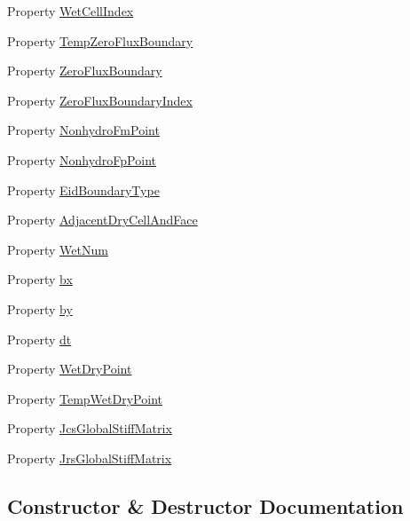 \begin{DoxyCompactItemize}
\item 
Property \hyperlink{class_ndg_nonhydrostatic_solver2d_ae2a95b4131bef735e3c0675026a2f18a}{Wet\+Cell\+Index}
\item 
Property \hyperlink{class_ndg_nonhydrostatic_solver2d_ac0b36311b03d5653b72961f540cbeaf6}{Temp\+Zero\+Flux\+Boundary}
\item 
Property \hyperlink{class_ndg_nonhydrostatic_solver2d_a8c0f32e33234a365fd8ae3e1181e5a3b}{Zero\+Flux\+Boundary}
\item 
Property \hyperlink{class_ndg_nonhydrostatic_solver2d_adeb35a9403549b9a0161daabb0ec450d}{Zero\+Flux\+Boundary\+Index}
\item 
Property \hyperlink{class_ndg_nonhydrostatic_solver2d_ab23f0fef0b83b0a81a23ee77020f0323}{Nonhydro\+Fm\+Point}
\item 
Property \hyperlink{class_ndg_nonhydrostatic_solver2d_a4c60b70b566ca2a7daefe12eba99d14c}{Nonhydro\+Fp\+Point}
\item 
Property \hyperlink{class_ndg_nonhydrostatic_solver2d_af4c2371bad87e70ebb677d36815ca439}{Eid\+Boundary\+Type}
\item 
Property \hyperlink{class_ndg_nonhydrostatic_solver2d_a660ef986dae1ac5e98c306c3963dc0e4}{Adjacent\+Dry\+Cell\+And\+Face}
\item 
Property \hyperlink{class_ndg_nonhydrostatic_solver2d_a11d1fc235608b3deda86743487abca9d}{Wet\+Num}
\item 
Property \hyperlink{class_ndg_nonhydrostatic_solver2d_a541fa409d1701863bb03ffe8addfba86}{bx}
\item 
Property \hyperlink{class_ndg_nonhydrostatic_solver2d_aeacde5b600958bdf34eab79a4171f77b}{by}
\item 
Property \hyperlink{class_ndg_nonhydrostatic_solver2d_a5fa3fa2714d9ebf42a033b01bb7cb3cb}{dt}
\item 
Property \hyperlink{class_ndg_nonhydrostatic_solver2d_aa6ad26c1e1b3d892f40c9301397bc736}{Wet\+Dry\+Point}
\item 
Property \hyperlink{class_ndg_nonhydrostatic_solver2d_a510a707658cf9fc79f1fc3e0f6a79865}{Temp\+Wet\+Dry\+Point}
\item 
Property \hyperlink{class_ndg_nonhydrostatic_solver2d_a3de8bf2b2f2b867d2737aa188d31c028}{Jcs\+Global\+Stiff\+Matrix}
\item 
Property \hyperlink{class_ndg_nonhydrostatic_solver2d_a5e793cac51aca8b0540314acf093151f}{Jrs\+Global\+Stiff\+Matrix}
\end{DoxyCompactItemize}


\subsection{Constructor \& Destructor Documentation}
\mbox{\label{class_ndg_nonhydrostatic_solver2d_ab27493a25d5bbeb1fe764113fc403920}} 
